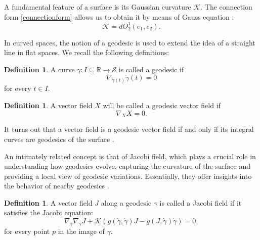 \documentclass{article}
\theoremstyle{remark}
\theoremstyle{definition}
\newtheorem{definition}[remark]{Definition}
\begin{document}
A fundamental feature of a surface is its Gaussian curvature $\mathcal{K}$. The connection form \eqref{connectionform} allows us to obtain it by means of Gauss equation \cite{chen1999lectures,ivey2016cartan}:
\begin{equation}\label{eq:curvature}
    \mathcal{K}=d\Theta^1_2(e_1,e_2).
\end{equation}

In curved spaces, the notion of a geodesic is used to extend the idea of a straight line in flat spaces. We recall the following definitions:
\begin{definition}
A curve $\gamma: I\subseteq \mathbb R \to \mathcal{S}$ is called a geodesic if
$$
\nabla_{\dot{\gamma}(t)}\dot{\gamma}(t)=0
$$
for every $t\in I$.
\end{definition}

\begin{definition}
A vector field $X$ will be called a geodesic vector field if 
$$
\nabla_{X}X=0.
$$

\end{definition}

It turns out that a vector field is a geodesic vector field if and only if its integral curves are geodesics of the surface \cite{lee2006curvature,docarmoriemannian,Carinena2023}.

An intimately related concept is that of Jacobi field, which plays a crucial role in understanding how geodesics evolve, capturing the curvature of the surface and providing a local view of geodesic variations. Essentially, they offer insights into the behavior of nearby geodesics \cite{lee2006curvature}.

\begin{definition}
A vector field $J$ along a geodesic $\gamma$ is called a Jacobi field if it satisfies the Jacobi equation:
\begin{equation}\label{eq:Jacobi}
\nabla_{\dot{\gamma}} \nabla_{\dot{\gamma}} J+\mathcal{K}\left( g(\dot{\gamma},\dot{\gamma})J-g(J,\dot{\gamma})\dot{\gamma}\right)=0,
\end{equation}
for every point $p$ in the image of $\gamma$. 
\end{definition}
\end{document}
